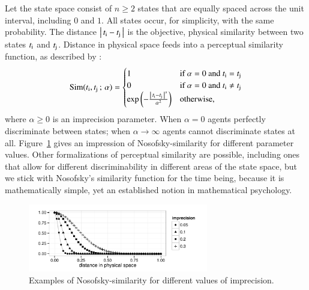 \documentclass[fleqn,reqno,10pt]{article}
\newcommand{\imprecision}{\ensuremath{\alpha}} %
\newcommand{\similarity}{\ensuremath{\mathrm{Sim}}} %
\begin{document}
Let the state space consist of $n \ge 2$ states that are equally spaced across the unit
interval, including $0$ and $1$. All states occur, for simplicity, with the same probability.
The distance $\left \lvert \, t_{\mathrm{i}} - t_{\mathrm{j}} \, \right\rvert$ is the objective, physical similarity between
two states $t_{\mathrm{i}}$ and $t_{\mathrm{j}}$. Distance in physical space feeds into a perceptual
similarity function, as described by \citet{Nosofsky1986:Attention-Simil}:
\begin{align*}
  \similarity(\mystate{i}, \mystate{j} \myts ; \myts \imprecision) =
      \begin{cases}
    1 & \textrm{if } \imprecision = 0 \textrm{ and } \mystate{i} = \mystate{j} \\
    0 & \textrm{if } \imprecision = 0 \textrm{ and } \mystate{i} \neq \mystate{j} \\
 \expo \left ( -  \frac{\card{\mystate{i} - \mystate{j}}^s}{ \imprecision^2} \right ) & \textrm{otherwise,} \\
    \end{cases}
\end{align*}
where $\imprecision \ge 0$ is an imprecision parameter. When $\imprecision=0$ agents perfectly
discriminate between states; when $\imprecision \rightarrow \infty$ agents cannot discriminate
states at all. Figure~\ref{fig:NosofskySim} gives an impression of Nosofsky-similarity for
different parameter values. Other formalizations of perceptual similarity are possible,
including ones that allow for different discriminability in different areas of the state space,
but we stick with Nosofsky's similarity function for the time being, because it is
mathematically simple, yet an established notion in mathematical psychology.

\begin{figure}
  \centering

  \includegraphics[width=0.7\textwidth]{plots/NosofskySim.pdf}

  \caption{Examples of Nosofsky-similarity for different values of
    imprecision.}
  \label{fig:NosofskySim}
\end{figure}
\end{document}
